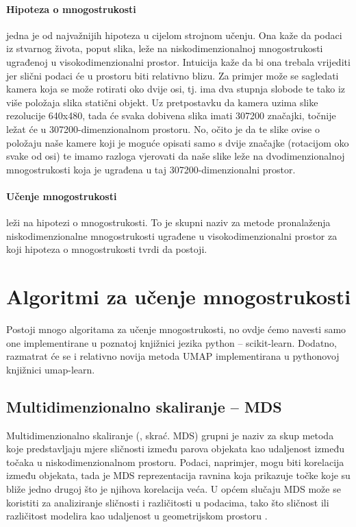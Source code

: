 \documentclass[times, utf8, diplomski]{fer}
\begin{document}
\paragraph{Hipoteza o mnogostrukosti} jedna je od najvažnijih hipoteza u cijelom strojnom učenju. Ona kaže da podaci iz stvarnog života, poput slika, leže na niskodimenzionalnoj mnogostrukosti ugrađenoj u visokodimenzionalni prostor. Intuicija kaže da bi ona trebala vrijediti jer slični podaci će u prostoru biti relativno blizu. Za primjer može se sagledati kamera koja se može rotirati oko dvije osi, tj. ima dva stupnja slobode te tako iz više položaja slika statični objekt. Uz pretpostavku da kamera uzima slike rezolucije 640x480, tada će svaka dobivena slika imati 307200 značajki, točnije ležat će u 307200-dimenzionalnom prostoru. No, očito je da te slike ovise o položaju naše kamere koji je moguće opisati samo s dvije značajke (rotacijom oko svake od osi) te imamo razloga vjerovati da naše slike leže na dvodimenzionalnoj mnogostrukosti koja je ugrađena u taj 307200-dimenzionalni prostor.

\paragraph{Učenje mnogostrukosti} leži na hipotezi o mnogostrukosti. To je skupni naziv za metode pronalaženja niskodimenzionalne mnogostrukosti ugrađene u visokodimenzionalni prostor za koji hipoteza o mnogostrukosti tvrdi da postoji.

\section{Algoritmi za učenje mnogostrukosti}

Postoji mnogo algoritama za učenje mnogostrukosti, no ovdje ćemo navesti samo one implementirane u poznatoj knjižnici jezika python -- scikit-learn. Dodatno, razmatrat će se i relativno novija metoda UMAP implementirana u pythonovoj knjižnici umap-learn.

\subsection{Multidimenzionalno skaliranje -- MDS}

Multidimenzionalno skaliranje (, skrać. MDS) grupni je naziv za skup metoda koje predstavljaju mjere sličnosti između parova objekata kao udaljenost između točaka u niskodimenzionalnom prostoru. Podaci, naprimjer, mogu biti korelacija između objekata, tada je MDS reprezentacija ravnina koja prikazuje točke koje su bliže jedno drugoj što je njihova korelacija veća. U općem slučaju MDS može se koristiti za analiziranje sličnosti i različitosti u podacima, tako što sličnost ili različitost modelira kao udaljenost u geometrijskom prostoru \citep{borg2005modern}.
\end{document}
